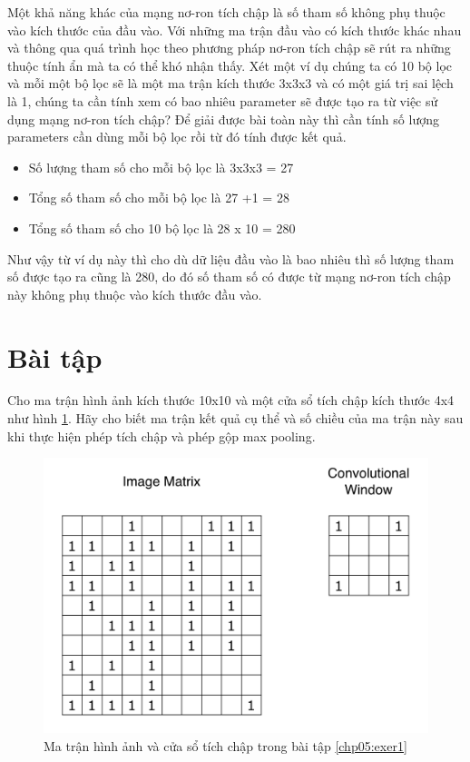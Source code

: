 Một khả năng khác của mạng nơ-ron tích chập là số tham số không phụ thuộc vào kích thước của đầu vào. Với những ma trận đầu vào có kích thước khác nhau và thông qua quá trình học theo phương pháp nơ-ron tích chập sẽ rút ra những thuộc tính ẩn mà ta có thể khó nhận thấy. Xét một ví dụ chúng ta có 10 bộ lọc và mỗi một bộ lọc sẽ là một ma trận kích thước 3x3x3 và có một giá trị sai lệch là 1, chúng ta cần tính xem có bao nhiêu parameter sẽ được tạo ra từ việc sử dụng mạng nơ-ron tích chập? Để giải được bài toàn này thì cần tính số lượng parameters cần dùng mỗi bộ lọc rồi từ đó tính được kết quả.

\begin{itemize}
    \item Số lượng tham số cho mỗi bộ lọc là 3x3x3 = 27
    \item Tổng số tham số cho mỗi bộ lọc là 27 +1 = 28
    \item Tổng số tham số cho 10 bộ lọc là 28 x 10 = 280
\end{itemize}

Như vậy từ ví dụ này thì cho dù dữ liệu đầu vào là bao nhiêu thì số lượng tham số được tạo ra cũng là 280, do đó số tham số có được từ mạng nơ-ron tích chập này không phụ thuộc vào kích thước đầu vào.

\section{Bài tập}
\begin{exer}
\label{chp05:exer1}
Cho ma trận hình ảnh kích thước 10x10 và một cửa sổ tích chập kích thước 4x4 như hình \ref{fig:CNNExercise1}. Hãy cho biết ma trận kết quả cụ thể và số chiều của ma trận này sau khi thực hiện phép tích chập và phép gộp max pooling.

\begin{figure}[!h]
	\centering
		\includegraphics[width=0.8\columnwidth]{books/artificial-neural-network/chapter05/figure/cnn_exercise_1.png}
		\centering
	\caption{Ma trận hình ảnh và cửa sổ tích chập trong bài tập \ref{chp05:exer1}}
	\label{fig:CNNExercise1}
\end{figure}
\end{exer}


